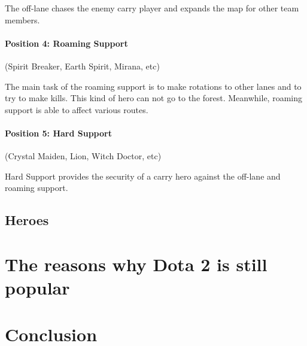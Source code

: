 \documentclass[10pt,twoside,slovak,a4paper]{article}
\begin{document}
The off-lane chases the enemy carry player and expands the map for other team members.
\paragraph{Position 4: Roaming Support}(Spirit Breaker, Earth Spirit, Mirana, etc)

The main task of the roaming support is to make rotations to other lanes and to try to make kills. This kind of hero can not go to the forest. Meanwhile, roaming support is able to affect various routes.
\paragraph{Position 5: Hard Support} (Crystal Maiden, Lion, Witch Doctor, etc)

Hard Support provides the security of a carry hero against the off-lane and roaming support.

\subsection{Heroes} \label{heroes}


\section{The reasons why Dota 2 is still popular} \label{the reasons why Dota 2 is still popular}

\section{Conclusion} \label{conclusion} %






\end{document}
